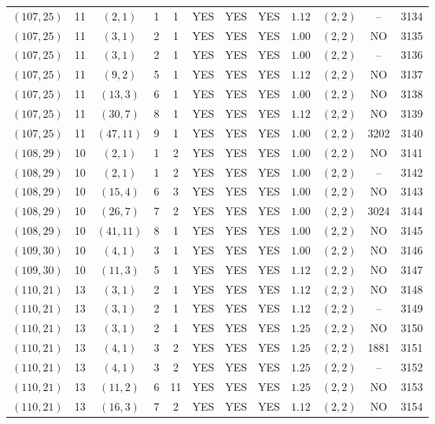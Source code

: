 \begin{longtable}{|c|c|c|c|c|c|c|c|c|c|c|c|}
$(107,25)$ & 11 & $(2,1)$ & 1 & 1 & YES & YES & YES & $1.12$ & $(2,2)$ & -- & 3134\\
$(107,25)$ & 11 & $(3,1)$ & 2 & 1 & YES & YES & YES & $1.00$ & $(2,2)$ & NO & 3135\\
$(107,25)$ & 11 & $(3,1)$ & 2 & 1 & YES & YES & YES & $1.00$ & $(2,2)$ & -- & 3136\\
$(107,25)$ & 11 & $(9,2)$ & 5 & 1 & YES & YES & YES & $1.12$ & $(2,2)$ & NO & 3137\\
$(107,25)$ & 11 & $(13,3)$ & 6 & 1 & YES & YES & YES & $1.00$ & $(2,2)$ & NO & 3138\\
$(107,25)$ & 11 & $(30,7)$ & 8 & 1 & YES & YES & YES & $1.12$ & $(2,2)$ & NO & 3139\\
$(107,25)$ & 11 & $(47,11)$ & 9 & 1 & YES & YES & YES & $1.00$ & $(2,2)$ & 3202 & 3140\\
$(108,29)$ & 10 & $(2,1)$ & 1 & 2 & YES & YES & YES & $1.00$ & $(2,2)$ & NO & 3141\\
$(108,29)$ & 10 & $(2,1)$ & 1 & 2 & YES & YES & YES & $1.00$ & $(2,2)$ & -- & 3142\\
$(108,29)$ & 10 & $(15,4)$ & 6 & 3 & YES & YES & YES & $1.00$ & $(2,2)$ & NO & 3143\\
$(108,29)$ & 10 & $(26,7)$ & 7 & 2 & YES & YES & YES & $1.00$ & $(2,2)$ & 3024 & 3144\\
$(108,29)$ & 10 & $(41,11)$ & 8 & 1 & YES & YES & YES & $1.00$ & $(2,2)$ & NO & 3145\\
$(109,30)$ & 10 & $(4,1)$ & 3 & 1 & YES & YES & YES & $1.00$ & $(2,2)$ & NO & 3146\\
$(109,30)$ & 10 & $(11,3)$ & 5 & 1 & YES & YES & YES & $1.12$ & $(2,2)$ & NO & 3147\\
$(110,21)$ & 13 & $(3,1)$ & 2 & 1 & YES & YES & YES & $1.12$ & $(2,2)$ & NO & 3148\\
$(110,21)$ & 13 & $(3,1)$ & 2 & 1 & YES & YES & YES & $1.12$ & $(2,2)$ & -- & 3149\\
$(110,21)$ & 13 & $(3,1)$ & 2 & 1 & YES & YES & YES & $1.25$ & $(2,2)$ & NO & 3150\\
$(110,21)$ & 13 & $(4,1)$ & 3 & 2 & YES & YES & YES & $1.25$ & $(2,2)$ & 1881 & 3151\\
$(110,21)$ & 13 & $(4,1)$ & 3 & 2 & YES & YES & YES & $1.25$ & $(2,2)$ & -- & 3152\\
$(110,21)$ & 13 & $(11,2)$ & 6 & 11 & YES & YES & YES & $1.25$ & $(2,2)$ & NO & 3153\\
$(110,21)$ & 13 & $(16,3)$ & 7 & 2 & YES & YES & YES & $1.12$ & $(2,2)$ & NO & 3154\\

\end{longtable}

